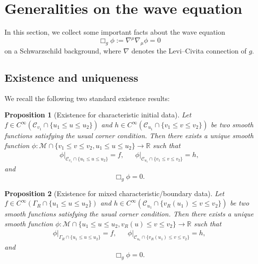 \documentclass[11pt,english]{article}
\numberwithin{equation}{section}
\theoremstyle{remark}
\theoremstyle{plain}
\newtheorem{prop}{Proposition}[section]
\theoremstyle{remark}
\renewcommand{\(}{\left(}
\renewcommand{\)}{\right)}
\begin{document}
\section{Generalities on the wave equation}\label{sec:wave}
In this section, we collect some important facts about the wave equation 
\begin{equation}
\Box_g\phi:=\nabla^\mu\nabla_\mu \phi=0
\end{equation}
on a Schwarzschild background, where $\nabla$ denotes the Levi--Civita connection of $g$.
\subsection{Existence and uniqueness}
We recall the following two standard existence results:
\begin{prop}[Existence for characteristic initial data]
Let $f\in C^{\infty}(\mathcal{C}_{v_1}\cap\{u_1\leq u\leq u_2\})$ and $h\in C^{\infty}(\mathcal{C}_{u_1}\cap\{v_1\leq v\leq v_2\})$ be two smooth functions satisfying the usual corner condition. 
Then there exists a unique smooth function $\phi:\mathcal{M}\cap\{v_1\leq v\leq v_2,u_1\leq u\leq u_2\}\to \mathbb{R}$ such that
\begin{align*}
\phi|_{\mathcal{C}_{v_1}\cap\{u_1\leq u\leq u_2\}}=f,&& \phi|_{\mathcal{C}_{u_1}\cap\{v_1\leq v\leq v_2\}} =h,
\end{align*}
and
$$\Box_g\phi=0.$$
\end{prop}


\begin{prop}[Existence for mixed characteristic/boundary data]\label{prop:existence:mixedboundary}
Let $f\in C^{\infty}(\Gamma_R\cap\{u_1\leq u\leq u_2\})$ and $h\in C^{\infty}(\mathcal{C}_{u_1}\cap\{v_R(u_1)\leq v\leq v_2\})$ be two smooth functions satisfying the usual corner condition.
Then there exists a unique smooth function $\phi:\mathcal{M}\cap\{u_1\leq u\leq u_2,v_R(u)\leq v\leq v_2\}\to \mathbb{R}$ such that
\begin{align*}
\phi|_{\Gamma_R\cap\{u_1\leq u\leq u_2\}}=f,&& \phi|_{\mathcal{C}_{u_1}\cap\{v_R(u_1)\leq v\leq v_2\}} =h,
\end{align*}
and
$$\Box_g\phi=0.$$
\end{prop}
\end{document}

